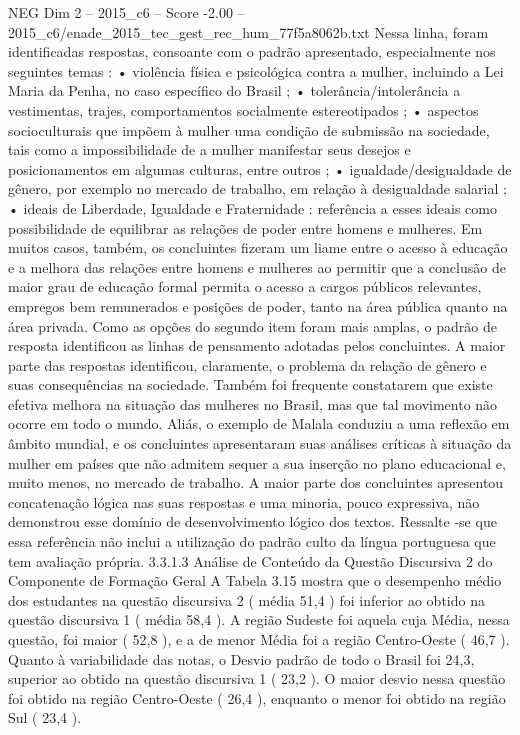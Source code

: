 \begin{textsample}{NEG Dim 2 – 2015\_c6 – Score -2.00 – 2015\_c6/enade\_2015\_tec\_gest\_rec\_hum\_77f5a8062b.txt}
Nessa linha, foram identificadas respostas, consoante com o padrão apresentado, especialmente nos seguintes temas : • violência física e psicológica contra a mulher, incluindo a Lei Maria da Penha, no caso específico do Brasil ; • tolerância/intolerância a vestimentas, trajes, comportamentos socialmente estereotipados ; • aspectos socioculturais que impõem à mulher uma condição de submissão na sociedade, tais como a impossibilidade de a mulher manifestar seus desejos e posicionamentos em algumas culturas, entre outros ; • igualdade/desigualdade de gênero, por exemplo no mercado de trabalho, em relação à desigualdade salarial ; • ideais de Liberdade, Igualdade e Fraternidade : referência a esses ideais como possibilidade de equilibrar as relações de poder entre homens e mulheres.
Em muitos casos, também, os concluintes fizeram um liame entre o acesso à educação e a melhora das relações entre homens e mulheres ao permitir que a conclusão de maior grau de educação formal permita o acesso a cargos públicos relevantes, empregos bem remunerados e posições de poder, tanto na área pública quanto na área privada.
Como as opções do segundo item foram mais amplas, o padrão de resposta identificou as linhas de pensamento adotadas pelos concluintes.
A maior parte das respostas identificou, claramente, o problema da relação de gênero e suas consequências na sociedade.
Também foi frequente constatarem que existe efetiva melhora na situação das mulheres no Brasil, mas que tal movimento não ocorre em todo o mundo.
Aliás, o exemplo de Malala conduziu a uma reflexão em âmbito mundial, e os concluintes apresentaram suas análises críticas à situação da mulher em países que não admitem sequer a sua inserção no plano educacional e, muito menos, no mercado de trabalho.
A maior parte dos concluintes apresentou concatenação lógica nas suas respostas e uma minoria, pouco expressiva, não demonstrou esse domínio de desenvolvimento lógico dos textos.
Ressalte -se que essa referência não inclui a utilização do padrão culto da língua portuguesa que tem avaliação própria. 3.3.1.3 Análise de Conteúdo da Questão Discursiva 2 do Componente de Formação Geral A Tabela 3.15 mostra que o desempenho médio dos estudantes na questão discursiva 2 ( média 51,4 ) foi inferior ao obtido na questão discursiva 1 ( média 58,4 ).
A região Sudeste foi aquela cuja Média, nessa questão, foi maior ( 52,8 ), e a de menor Média foi a região Centro-Oeste ( 46,7 ).
Quanto à variabilidade das notas, o Desvio padrão de todo o Brasil foi 24,3, superior ao obtido na questão discursiva 1 ( 23,2 ).
O maior desvio nessa questão foi obtido na região Centro-Oeste ( 26,4 ), enquanto o menor foi obtido na região Sul ( 23,4 ).

\end{textsample}
